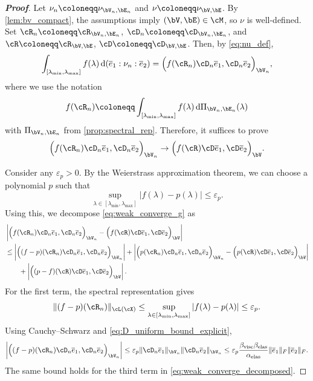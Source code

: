 \begin{proof}[\bf Proof]
Let $\nu_n \coloneqq \nu_{\bV_n,\bE_n}$ and $\nu \coloneqq \nu_{\bV,\bE}$. By \cref{lem:bv_compact}, the assumptions imply $(\bV,\bE)\in\cM$, so $\nu$ is well-defined. Set $\cR_n\coloneqq \cR_{\bV_n,\bE_n}$, $\cD_n\coloneqq \cD_{\bV_n,\bE_n}$, and $\cR\coloneqq \cR_{\bV,\bE}$, $\cD\coloneqq \cD_{\bV,\bE}$. Then, by \cref{eq:nu_def},
\begin{equation*}
    \int_{[\lambda_{\min},\lambda_{\max}]} f(\lambda)\,\mathrm{d}(\overline e_1:\nu_n:\overline e_2)
    =\Bigl(f(\cR_n)\cD_n\overline e_1,\cD_n\overline e_2\Bigr)_{\bV_n},
\end{equation*}
where we use the notation
\begin{equation*}
    f(\cR_n)\coloneqq \int_{[\lambda_{\min},\lambda_{\max}]} f(\lambda)\,\mathrm{d}\Pi_{\bV_n,\bE_n}(\lambda)
\end{equation*}
with $\Pi_{\bV_n,\bE_n}$ from \cref{prop:spectral_rep}. Therefore, it suffices to prove
\begin{equation}\label{eq:weak_converge_g}
    \Bigl(f(\cR_n)\cD_n\overline e_1,\cD_n\overline e_2\Bigr)_{\bV_n}\to \Bigl(f(\cR)\cD\overline e_1,\cD\overline e_2\Bigr)_{\bV}.
\end{equation}

Consider any $\varepsilon_p>0$. By the Weierstrass approximation theorem, we can choose a polynomial $p$ such that
\begin{equation*}
    \sup_{\lambda\in[\lambda_{\min},\lambda_{\max}]}|f(\lambda)-p(\lambda)|\le \varepsilon_p.
\end{equation*}
Using this, we decompose \cref{eq:weak_converge_g} as
\begin{align}
&\left|\Bigl(f(\cR_n)\cD_n\overline e_1,\cD_n\overline e_2\Bigr)_{\bV_n}-\Bigl(f(\cR)\cD\overline e_1,\cD\overline e_2\Bigr)_{\bV}\right|\nonumber\\
&\leq \left|\Bigl((f-p)(\cR_n)\cD_n\overline e_1,\cD_n\overline e_2\Bigr)_{\bV_n}\right|
+\left|\Bigl(p(\cR_n)\cD_n\overline e_1,\cD_n\overline e_2\Bigr)_{\bV_n}-\Bigl(p(\cR)\cD\overline e_1,\cD\overline e_2\Bigr)_{\bV}\right|\nonumber
\\
&\qquad+\left|\Bigl((p-f)(\cR)\cD\overline e_1,\cD\overline e_2\Bigr)_{\bV}\right|.\label{eq:weak_converge_decomposed}
\end{align}
For the first term, the spectral representation gives
\begin{equation*}
    \|(f-p)(\cR_n)\|_{\cL(\cX)}\le \sup_{\lambda\in [\lambda_{\min},\lambda_{\max}]}|f(\lambda)-p(\lambda)|\le \varepsilon_p.
\end{equation*}
Using Cauchy--Schwarz and \cref{eq:D_uniform_bound_explicit},
\begin{equation*}
\left|\Bigl((f-p)(\cR_n)\cD_n\overline e_1,\cD_n\overline e_2\Bigr)_{\bV_n}\right|
\leq \varepsilon_p\|\cD_n\overline e_1\|_{\bV_n}\|\cD_n\overline e_2\|_{\bV_n}
\leq \varepsilon_p\frac{\beta_{\rm visc}\beta_{\rm elas}}{\alpha_{\rm elas}}\|\overline e_1\|_F\|\overline e_2\|_F.
\end{equation*}
The same bound holds for the third term in \cref{eq:weak_converge_decomposed}.


\end{proof}
